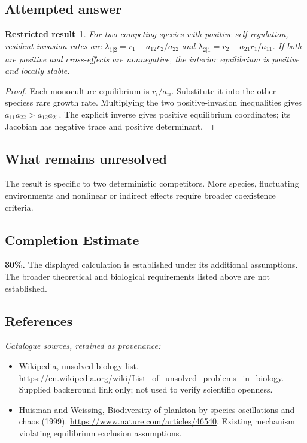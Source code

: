 \documentclass[11pt]{article}
\newtheorem{attemptresult}{Restricted result}[section]
\begin{document}
\subsection{Attempted answer}
\begin{attemptresult}
For two competing species with positive self-regulation, resident invasion rates are $\lambda_{1|2}=r_1-a_{12}r_2/a_{22}$ and $\lambda_{2|1}=r_2-a_{21}r_1/a_{11}$. If both are positive and cross-effects are nonnegative, the interior equilibrium is positive and locally stable.
\end{attemptresult}
\begin{proof}
Each monoculture equilibrium is $r_i/a_{ii}$. Substitute it into the other species\textquotesingle s rare growth rate. Multiplying the two positive-invasion inequalities gives $a_{11}a_{22}>a_{12}a_{21}$. The explicit inverse gives positive equilibrium coordinates; its Jacobian has negative trace and positive determinant.
\end{proof}
\subsection{What remains unresolved}
The result is specific to two deterministic competitors. More species, fluctuating environments and nonlinear or indirect effects require broader coexistence criteria.
\subsection{Completion Estimate}
\textbf{30\%.} The displayed calculation is established under its additional assumptions. The broader theoretical and biological requirements listed above are not established.
\subsection{References}
\noindent\emph{Catalogue sources, retained as provenance:}
\begin{itemize}
\item Wikipedia, unsolved biology list. \url{https://en.wikipedia.org/wiki/List_of_unsolved_problems_in_biology}. Supplied background link only; not used to verify scientific openness.
\item Huisman and Weissing, Biodiversity of plankton by species oscillations and chaos (1999). \url{https://www.nature.com/articles/46540}. Existing mechanism violating equilibrium exclusion assumptions.
\end{itemize}
\clearpage
\end{document}
